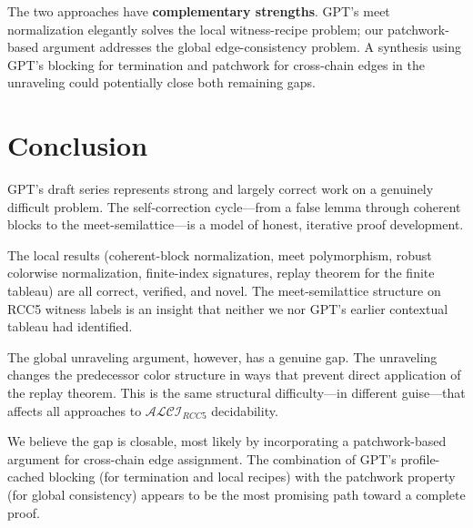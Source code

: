 \documentclass[a4paper,11pt]{article}
\theoremstyle{definition}
\newcommand{\ALCIRCC}[1]{\ensuremath{\mathcal{ALCI}_{\mathit{RCC#1}}}}
\begin{document}
\noindent
The two approaches have \textbf{complementary strengths}.  GPT's meet
normalization elegantly solves the local witness-recipe problem; our
patchwork-based argument addresses the global edge-consistency problem.
A synthesis using GPT's blocking for termination and patchwork for
cross-chain edges in the unraveling could potentially close both
remaining gaps.


\section{Conclusion}
\label{sec:conclusion}

GPT's draft series represents strong and largely correct work on a
genuinely difficult problem.  The self-correction cycle---from a
false lemma through coherent blocks to the meet-semilattice---is a
model of honest, iterative proof development.

The local results (coherent-block normalization, meet polymorphism,
robust colorwise normalization, finite-index signatures, replay
theorem for the finite tableau) are all correct, verified, and novel.
The meet-semilattice structure on RCC5 witness labels is an insight
that neither we nor GPT's earlier contextual tableau had identified.

The global unraveling argument, however, has a genuine gap.  The
unraveling changes the predecessor color structure in ways that
prevent direct application of the replay theorem.  This is the same
structural difficulty---in different guise---that affects all
approaches to $\ALCIRCC{5}$ decidability.

We believe the gap is closable, most likely by incorporating a
patchwork-based argument for cross-chain edge assignment.  The
combination of GPT's profile-cached blocking (for termination and
local recipes) with the patchwork property (for global consistency)
appears to be the most promising path toward a complete proof.
\end{document}
